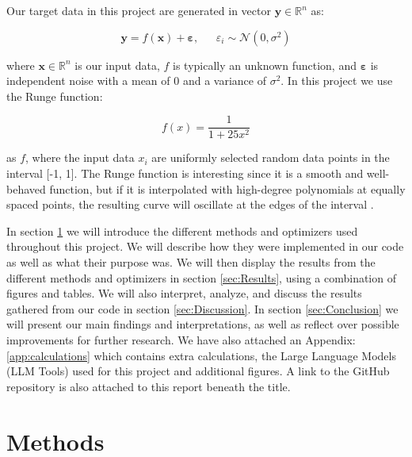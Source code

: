 \documentclass[reprint,english,notitlepage]{revtex4-2}  %
\begin{document}
Our target data in this project are generated in vector $\boldsymbol{y} \in \mathbb{R}^n$ as:

\begin{equation}\label{eq:data_generated}
    \boldsymbol{y} = f(\bm{x}) + \bm{\varepsilon}, \ \ \ \ \ \ \ \varepsilon_i \sim \mathscr{N}(0, {\sigma}^2)
\end{equation}

where $\bm{x} \in \mathbb{R}^n$ is our input data, $f$ is typically an unknown function, and $\bm{\varepsilon}$ is independent noise with a mean of 0 and a variance of $\sigma^2$. In this project we use the Runge function:

\begin{equation}\label{eq:runge_func}
    f(x) = \frac{1}{1+25x^2}
\end{equation}

as $f$, where the input data $x_i$ are uniformly selected random data points in the interval [-1, 1]. The Runge function is interesting since it is a smooth and well-behaved function, but if it is interpolated with high-degree polynomials at equally spaced points, the resulting curve will oscillate at the edges of the interval \cite{Runge_func}. 



In section \ref{sec:Methods} we will introduce the different methods and optimizers used throughout this project. We will describe how they were implemented in our code as well as what their purpose was. We will then display the results from the different methods and optimizers in section \ref{sec:Results}, using a combination of figures and tables. We will also interpret, analyze, and discuss the results gathered from our code in section \ref{sec:Discussion}. In section \ref{sec:Conclusion} we will present our main findings and interpretations, as well as reflect over possible improvements for further research. We have also attached an Appendix: \ref{app:calculations} which contains extra calculations, the Large Language Models (LLM Tools) used for this project and additional figures.  
A link to the GitHub repository is also attached to this report beneath the title.


\section{Methods}\label{sec:Methods}
\end{document}
